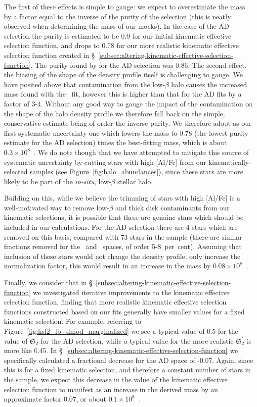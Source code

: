 The first of these effects is simple to gauge: we expect to overestimate the mass by a factor equal to the inverse of the purity of the selection (this is neatly observed when determining the mass of our mocks). In the case of the AD selection the purity is estimated to be 0.9 for our initial kinematic effective selection function, and drops to 0.78 for our more realistic kinematic effective selection function created in \S~\ref{subsec:altering-kinematic-effective-selection-function}. The purity found by \cite{lane22} for the AD selection was 0.86. The second effect, the biasing of the shape of the density profile itself is challenging to gauge. We have posited above that contamination from the low-$\beta$ halo causes the increased mass found with the \JRLz\ fit, however this is higher than that for the AD fits by a factor of 3-4. Without any good way to gauge the impact of the contamination on the shape of the \gse halo density profile we therefore fall back on the simple, conservative estimate being of order the inverse purity. We therefore adopt as our first systematic uncertainty one which lowers the mass to 0.78 (the lowest purity estimate for the AD selection) times the best-fitting mass, which is about $0.3\times10^{8}$~\Msun. We do note though that we have attempted to mitigate this source of systematic uncertainty by cutting stars with high [Al/Fe] from our kinematically-selected \gse samples (see Figure~\ref{fig:halo_abundances}), since these stars are more likely to be part of the \textit{in-situ}, low-$\beta$ stellar halo.

Building on this, while we believe the trimming of stars with high [Al/Fe] is a well-motivated way to remove low-$\beta$ and thick disk contaminants from our kinematic selections, it is possible that these are genuine \gse stars which should be included in our calculations. For the AD selection there are 4 stars which are removed on this basis, compared with 73 stars in the sample (there are similar fractions removed for the \eLz\ and \JRLz\ spaces, of order 5-8~per~cent). Assuming that inclusion of these stars would not change the density profile, only increase the normalization factor, this would result in an increase in the mass by $0.08\times10^{8}$~\Msun.

Finally, we consider that in \S~\ref{subsec:altering-kinematic-effective-selection-function} we investigated iterative improvements to the kinematic effective selection function, finding that more realistic kinematic effective selection functions constructed based on our fits generally have smaller values for a fixed kinematic selection. For example, referring to Figure~\ref{fig:ksf2_lb_dmod_marginalized} we see a typical value of 0.5 for the value of $\mathfrak{S}_{2}$ for the AD selection, while a typical value for the more realistic $\mathfrak{S}_{2}^{\prime}$ is more like 0.45. In \S~\ref{subsec:altering-kinematic-effective-selection-function} we specifically calculated a fractional decrease for the AD space of -0.07. Again, since this is for a fixed kinematic selection, and therefore a constant number of stars in the sample, we expect this decrease in the value of the kinematic effective selection function to manifest as an increase in the derived mass by an approximate factor $0.07$, or about $0.1\times10^{8}$~\Msun.

